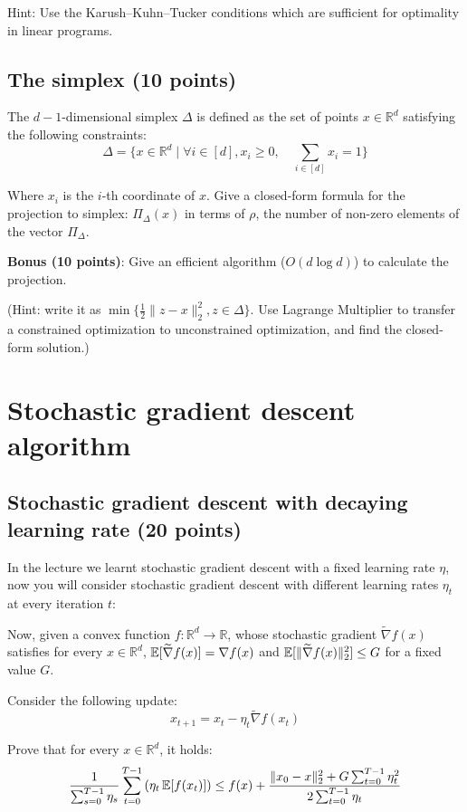 Hint: Use the Karush–Kuhn–Tucker conditions which are sufficient for optimality in linear programs.



\subsection{The simplex (10 points)}

The $d - 1$-dimensional simplex $\Delta$ is defined as   the set of points  $x \in \mathbb{R}^d$  satisfying the following constraints: 
$$\Delta = \{x  \in \mathbb{R}^d \mid  \forall i \in [d], x_i \geq 0, \quad \sum_{i \in [d]} x_i = 1\}$$

Where $x_i$ is the $i$-th coordinate of $x$. Give a closed-form formula for the projection to simplex: $\Pi_{\Delta}(x)$ in terms of $\rho$, the number of non-zero elements of the vector $\Pi_{\Delta}$.

\textbf{Bonus (10 points)}: Give an efficient algorithm ($O(d\log d)$) to calculate the projection.

(Hint: write it as  $\min\{\frac{1}{2}\|z - x \|_2^2, z \in \Delta \}$. Use Lagrange Multiplier to transfer a constrained optimization to unconstrained optimization, and find the closed-form solution.)


\newpage
\section{Stochastic gradient descent algorithm}

\subsection{Stochastic gradient descent with decaying learning rate (20 points)}

In the lecture we learnt stochastic gradient descent with a fixed learning rate $\eta$, now you will consider stochastic gradient descent with different learning rates $\eta_t$ at every iteration $t$: 


Now, given a convex function $f : \mathbb{R}^d \to \mathbb{R}$, whose stochastic gradient $\tilde{\nabla}f(x)$ satisfies  for every $x \in \mathbb{R}^d$, $\E[\tilde{\nabla}f(x)] = \nabla f(x)$ and $\E [\| \tilde{\nabla}f(x) \|_2^2] \leq G$ for a fixed value $G$.

Consider the following update:
$$x_{t + 1} = x_t - \eta_t \tilde{\nabla}f(x_t)$$

Prove that for every $x \in \mathbb{R}^d$, it holds:
$$ \frac{1}{\sum_{s = 0}^{T- 1} \eta_s} \sum_{t = 0}^{T - 1}\left( \eta_t \E[f(x_t)] \right) \leq f(x) + \frac{\|x_0 - x\|_2^2 + G \sum_{t = 0}^{T - 1} \eta_t^2}{2 \sum_{t = 0}^{T - 1} \eta_t}$$


